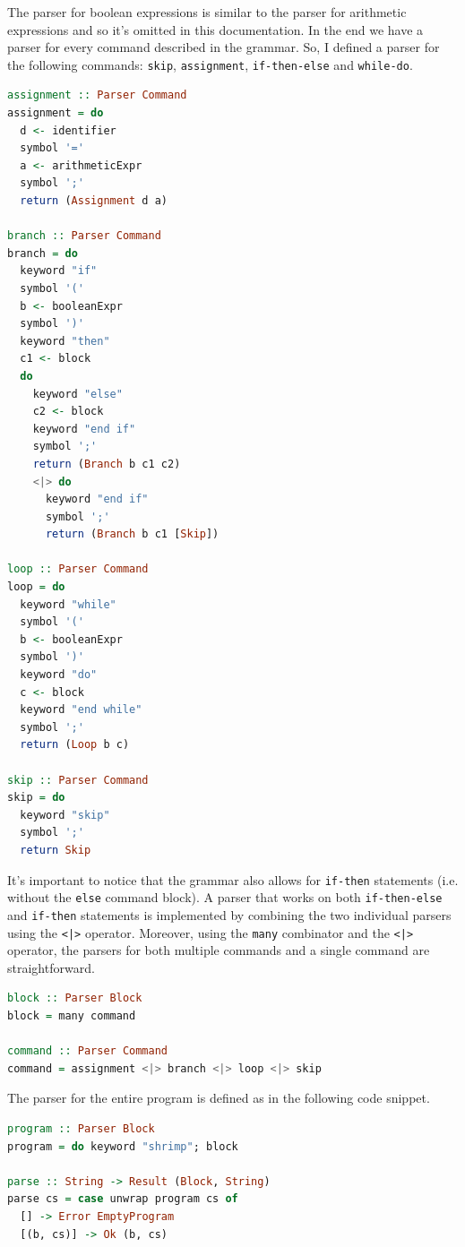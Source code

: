 \documentclass[12pt,a4paper]{article}
\begin{document}
The parser for boolean expressions is similar to the parser for arithmetic expressions and so it's omitted in this documentation. In the end we have a parser for every command described in the grammar.
So, I defined a parser for the following commands: \texttt{skip}, \texttt{assignment}, \texttt{if-then-else} and \texttt{while-do}.
\begin{lstlisting}[language=Haskell, style=custom-style]
assignment :: Parser Command
assignment = do
  d <- identifier
  symbol '='
  a <- arithmeticExpr
  symbol ';'
  return (Assignment d a)

branch :: Parser Command
branch = do
  keyword "if"
  symbol '('
  b <- booleanExpr
  symbol ')'
  keyword "then"
  c1 <- block
  do
    keyword "else"
    c2 <- block
    keyword "end if"
    symbol ';'
    return (Branch b c1 c2)
    <|> do
      keyword "end if"
      symbol ';'
      return (Branch b c1 [Skip])

loop :: Parser Command
loop = do
  keyword "while"
  symbol '('
  b <- booleanExpr
  symbol ')'
  keyword "do"
  c <- block
  keyword "end while"
  symbol ';'
  return (Loop b c)

skip :: Parser Command
skip = do
  keyword "skip"
  symbol ';'
  return Skip
\end{lstlisting}
It's important to notice that the grammar also allows for \texttt{if-then} statements (i.e. without the \texttt{else} command block).
A parser that works on both \texttt{if-then-else} and \texttt{if-then} statements is implemented by combining the two individual parsers using the \texttt{<|>} operator.
Moreover, using the \texttt{many} combinator and the \texttt{<|>} operator, the parsers for both multiple commands and a single command are straightforward.
\begin{lstlisting}[language=Haskell, style=custom-style]
block :: Parser Block
block = many command

command :: Parser Command
command = assignment <|> branch <|> loop <|> skip
\end{lstlisting}
The parser for the entire program is defined as in the following code snippet.
\begin{lstlisting}[language=Haskell, style=custom-style]
program :: Parser Block
program = do keyword "shrimp"; block

parse :: String -> Result (Block, String)
parse cs = case unwrap program cs of
  [] -> Error EmptyProgram
  [(b, cs)] -> Ok (b, cs)
\end{lstlisting}
\end{document}
